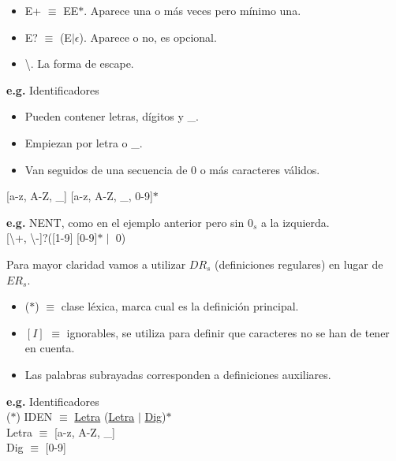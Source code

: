 \documentclass[\main/ApuntesPL.tex]{subfiles}
\begin{document}
\begin{itemize}
\begin{itemize}
\begin{itemize}
                        \par
                        e.g. [$^\wedge$0-9, a-z] es el conjunto de caracteres que no son dígitos ni letras minúsculas.
                    \item E+ $\equiv$ EE$\ast$. Aparece una o más veces pero mínimo una.
                    \item E? $\equiv$ (E$\mid\epsilon$). Aparece o no, es opcional.
                    \item \textbackslash. La forma de escape.
                  \end{itemize}
              \end{itemize}
      \end{itemize}

      \bigskip
      \par
      \textbf{e.g.} Identificadores
      \begin{itemize}
      \item Pueden contener letras, dígitos y \_.
      \item Empiezan por letra o \_.
      \item Van seguidos de una secuencia de 0 o más caracteres válidos.
      \end{itemize}
      \hspace{5mm}[a-z, A-Z, \_] [a-z, A-Z, \_, 0-9]$\ast$

      \bigskip
      \par
      \textbf{e.g.} NENT, como en el ejemplo anterior pero sin $0_s$ a la izquierda.\\
      \hspace{5mm} [\textbackslash+, \textbackslash -]?([1-9] [0-9]$\ast \mid$ 0)

      \newpage
      \par
      Para mayor claridad vamos a utilizar $DR_s$ (definiciones regulares) en lugar de $ER_s$.
      \begin{itemize}
        \item ($\ast$) $\equiv$ clase léxica, marca cual es la definición principal.
        \item $[I]$ $\equiv$ ignorables, se utiliza para definir que caracteres no se han de tener en cuenta.
        \item Las palabras subrayadas corresponden a definiciones auxiliares.
      \end{itemize}

      \bigskip
      \par
      \textbf{e.g.} Identificadores\\
      \hspace{5mm}($\ast$) IDEN $\equiv$ \underline{Letra} (\underline{Letra} $\mid$ \underline{Dig})$\ast$ \\
      \hspace{10mm} Letra $\equiv$ [a-z, A-Z, \_] \\
      \hspace{10mm} Dig $\equiv$ [0-9]
\end{document}
